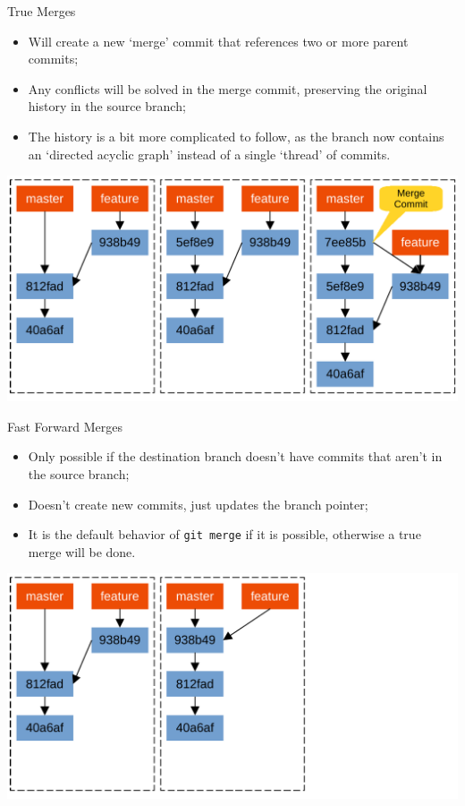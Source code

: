 \documentclass{beamer}
\begin{document}
\begin{frame}{True Merges}
  \begin{itemize}
    \item Will create a new `merge' commit that references two or more parent commits;
    \item Any conflicts will be solved in the merge commit, preserving the original history in the source branch;
    \item The history is a bit more complicated to follow, as the branch now contains an `directed acyclic graph' instead of a single `thread' of commits.
  \end{itemize}
  \begin{center}
    \includegraphics[scale=0.5]{git-true-merge}
  \end{center}
\end{frame}

\begin{frame}{Fast Forward Merges}
  \begin{itemize}
    \item Only possible if the destination branch doesn't have commits that aren't in the source branch;
    \item Doesn't create new commits, just updates the branch pointer;
    \item It is the default behavior of \texttt{git merge} if it is possible, otherwise a true merge will be done.
  \end{itemize}
  \begin{center}
    \includegraphics[scale=0.5]{git-fast-forward-merge}
  \end{center}
\end{frame}
\end{document}
